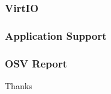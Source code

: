 \documentclass[10pt]{beamer}
\begin{document}
\begin{frame}
	\frametitle{VirtIO}

\end{frame}


\begin{frame}
	\frametitle{Application Support}
	

\end{frame}



\begin{frame}
	\frametitle{OSV Report}

\center
Thanks

\end{frame}
\end{document}

